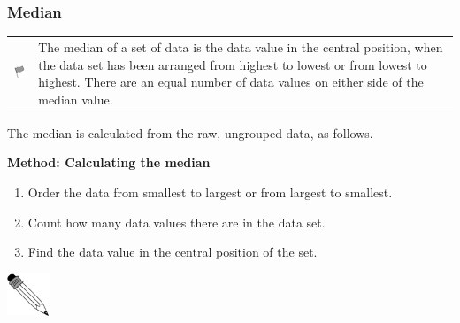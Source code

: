 \begin{description}[noitemsep]
\begin{description}[noitemsep]
            \subsubsection{ Median}
            \nopagebreak
            \par
            \label{m39400*fhsst!!!underscore!!!id1422}\begin{definition}
	  \begin{tabular*}{15 cm}{m{15 mm}m{}}
	\hspace*{-50pt}  \includegraphics[width=0.5in]{col11306.imgs/psflag2.png}   & \Definition{   \label{id2621547}\textbf{ Median }} { \label{m39400*meaningfhsst!!!underscore!!!id1422}
          \label{m39400*id211687}The median of a set of data is the data value in the central position, when the data set has been arranged from highest to lowest or from lowest to highest. There are an equal number of data values on either side of the median value. \par 
           } 
      \end{tabular*}
      \end{definition}
          \label{m39400*id211700}The median is calculated from the raw, ungrouped data, as follows.\par 
          \label{m39400*id211704}
            \textbf{Method: Calculating the median}
          \par 
          \label{m39400*id211711}\begin{enumerate}[noitemsep, label=\textbf{\arabic*}. ] 
            \label{m39400*uid66}\item Order the data from smallest to largest or from largest to smallest.
\label{m39400*uid67}\item Count how many data values there are in the data set.
\label{m39400*uid68}\item Find the data value in the central position of the set.
\end{enumerate}
\par
            \label{m39400*secfhsst!!!underscore!!!id1437}\vspace{.5cm} 
      \noindent
      \hspace*{-30pt}\includegraphics[width=0.5in]{col11306.imgs/pspencil2.png}   \raisebox{25mm}{   
}
\end{description}
\end{description}
